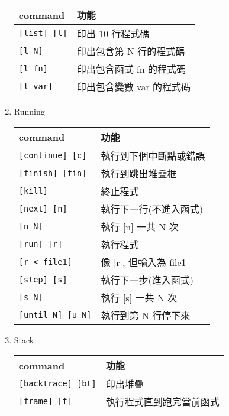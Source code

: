 \begin{enumerate}
    \begin{tabular}[c]{|p{2.28cm}|p{2.68cm}|}
        \hline
        command                         & 功能 \\
        \hline
        \verb|[list] [l]|               & 印出 10 行程式碼  \\
        \verb|[l N]|                    & 印出包含第 N 行的程式碼  \\
        \verb|[l fn]|                   & 印出包含函式 fn 的程式碼 \\
        \verb|[l var]|                  & 印出包含變數 var 的程式碼 \\
        \hline
    \end{tabular}
    \item Running \par
    \begin{tabular}[c]{|p{2.28cm}|p{2.68cm}|}
        \hline
        command                         & 功能 \\
        \hline
        \verb|[continue] [c]|           & 執行到下個中斷點或錯誤 \\
        \verb|[finish] [fin]|           & 執行到跳出堆疊框 \\
        \verb|[kill]|                   & 終止程式 \\
        \verb|[next] [n]|               & 執行下一行(不進入函式) \\
        \verb|[n N]|                    & 執行 [n] 一共 N 次 \\
        \verb|[run] [r]|                & 執行程式 \\
        \verb|[r < file1]|              & 像 [r], 但輸入為 file1 \\
        \verb|[step] [s]|               & 執行下一步(進入函式) \\
        \verb|[s N]|                    & 執行 [s] 一共 N 次 \\
        \verb|[until N] [u N]|          & 執行到第 N 行停下來 \\
        \hline
    \end{tabular}
    \item Stack \par
    \begin{tabular}[c]{|p{2.28cm}|p{2.68cm}|}
        \hline
        command                         & 功能 \\
        \hline
        \verb|[backtrace] [bt]|         & 印出堆疊 \\
        \verb|[frame] [f]|              & 執行程式直到跑完當前函式 \\

\end{tabular}
\end{enumerate}
